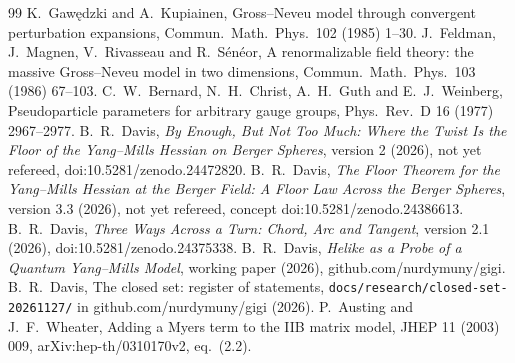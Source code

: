 \begin{thebibliography}{99}
 K.~Gaw\k{e}dzki and A.~Kupiainen, Gross--Neveu model through convergent perturbation expansions, Commun.\ Math.\ Phys.\ 102 (1985) 1--30.
 J.~Feldman, J.~Magnen, V.~Rivasseau and R.~S\'en\'eor, A renormalizable field theory: the massive Gross--Neveu model in two dimensions, Commun.\ Math.\ Phys.\ 103 (1986) 67--103.
 C.~W.~Bernard, N.~H.~Christ, A.~H.~Guth and E.~J.~Weinberg, Pseudoparticle parameters for arbitrary gauge groups, Phys.\ Rev.\ D 16 (1977) 2967--2977.
 B.~R.~Davis, \emph{By Enough, But Not Too Much: Where the Twist Is the Floor of the Yang--Mills Hessian on Berger Spheres}, version 2 (2026), not yet refereed, doi:10.5281/zenodo.24472820.
 B.~R.~Davis, \emph{The Floor Theorem for the Yang--Mills Hessian at the Berger Field: A Floor Law Across the Berger Spheres}, version 3.3 (2026), not yet refereed, concept doi:10.5281/zenodo.24386613.
 B.~R.~Davis, \emph{Three Ways Across a Turn: Chord, Arc and Tangent}, version 2.1 (2026), doi:10.5281/zenodo.24375338.
 B.~R.~Davis, \emph{Helike as a Probe of a Quantum Yang--Mills Model}, working paper (2026), github.com/nurdymuny/gigi.
 B.~R.~Davis, The closed set: register of statements, \texttt{docs/research/closed-set-20261127/} in github.com/nurdymuny/gigi (2026).
 P.~Austing and J.~F.~Wheater, Adding a Myers term to the IIB matrix model, JHEP 11 (2003) 009, arXiv:hep-th/0310170v2, eq.~(2.2).
\end{thebibliography}
